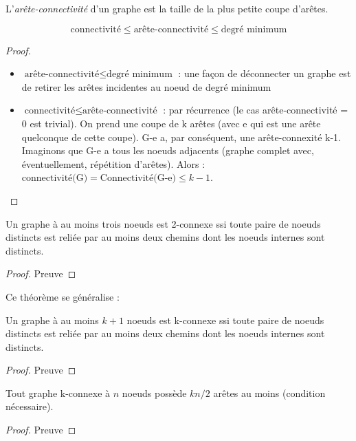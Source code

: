 \begin{mydef}
   L'\emph{arête-connectivité} d'un graphe est la taille de la plus petite coupe d'arêtes.
\end{mydef}

\begin{mytheo} 
 $$ \text{connectivité} \leq \text{arête-connectivité} \leq \text{degré minimum}$$
  \begin{proof}
     \begin{itemize}
					\item $\text{arête-connectivité} \leq \text{degré minimum}$ : une façon de déconnecter un graphe est de retirer les arêtes incidentes au noeud de degré minimum
					\item $\text{connectivité} \leq \text{arête-connectivité}$ : par récurrence (le cas arête-connectivité = 0 est trivial). On prend une coupe de k arêtes (avec e qui est une arête quelconque de cette coupe). G-e a, par conséquent, une arête-connexité k-1. Imaginons que G-e a tous les noeuds adjacents (graphe complet avec, éventuellement, répétition d'arêtes). Alors : $\text{connectivité(G)}=\text{Connectivité(G-e)} \leq k-1$. 
		 \end{itemize}
  \end{proof}
\end{mytheo}

\begin{mytheo} 
  Un graphe à au moins trois noeuds est 2-connexe ssi toute paire de noeuds distincts est reliée par au moins deux chemins dont les noeuds internes sont distincts.
  \begin{proof}
     Preuve \addTODO
  \end{proof}
\end{mytheo}

Ce théorème se généralise :

\begin{mytheo} 
  Un graphe à au moins $k + 1$ noeuds est k-connexe ssi toute paire de noeuds distincts est reliée par au moins deux chemins dont les noeuds internes sont distincts.
  \begin{proof}
     Preuve \addTODO
  \end{proof}
\end{mytheo}

\begin{mytheo} 
  Tout graphe k-connexe à $n$ noeuds possède $kn/2$ arêtes au moins (condition nécessaire).
  \begin{proof}
     Preuve \addTODO
  \end{proof}
\end{mytheo}

